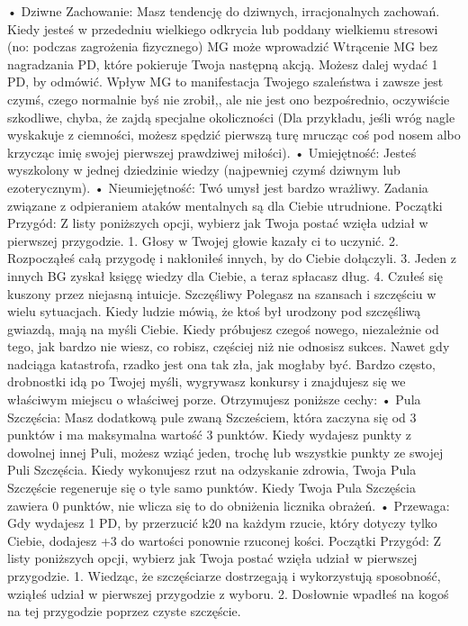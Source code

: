     • Dziwne Zachowanie: Masz tendencję do dziwnych, irracjonalnych zachowań. Kiedy jesteś w przededniu wielkiego odkrycia lub poddany wielkiemu stresowi (no: podczas zagrożenia fizycznego) MG może wprowadzić Wtrącenie MG bez nagradzania PD, które pokieruje Twoja następną akcją. Możesz dalej wydać 1 PD, by odmówić. Wpływ MG to manifestacja Twojego szaleństwa i zawsze jest czymś, czego normalnie byś nie zrobił,, ale nie jest ono bezpośrednio, oczywiście szkodliwe, chyba, że zajdą specjalne okoliczności (Dla przykładu, jeśli wróg nagle wyskakuje z ciemności, możesz spędzić pierwszą turę mrucząc coś pod nosem albo krzycząc imię swojej pierwszej prawdziwej miłości). 
    • Umiejętność: Jesteś wyszkolony w jednej dziedzinie wiedzy (najpewniej czymś dziwnym lub ezoterycznym).
    • Nieumiejętność: Twó umysł jest bardzo wrażliwy. Zadania związane z odpieraniem ataków mentalnych są dla Ciebie utrudnione.
Początki Przygód: Z listy poniższych opcji, wybierz jak Twoja postać wzięła udział w pierwszej przygodzie.
1. Głosy w Twojej głowie kazały ci to uczynić.
2. Rozpocząłeś całą przygodę i nakłoniłeś innych, by do Ciebie dołączyli.
3. Jeden z innych BG zyskał księgę wiedzy dla Ciebie, a teraz spłacasz dług.
4. Czułeś się kuszony przez niejasną intuicje.
Szczęśliwy
Polegasz na szansach i szczęściu w wielu sytuacjach. Kiedy ludzie mówią, że ktoś był urodzony pod szczęśliwą gwiazdą, mają na myśli Ciebie. Kiedy próbujesz czegoś nowego, niezależnie od tego, jak bardzo nie wiesz, co robisz, częściej niż nie odnosisz sukces. Nawet gdy nadciąga katastrofa, rzadko jest ona tak zła, jak mogłaby być. Bardzo często, drobnostki idą po Twojej myśli, wygrywasz konkursy i znajdujesz się we właściwym miejscu o właściwej porze.
Otrzymujesz poniższe cechy:
    • Pula Szczęścia: Masz dodatkową pule zwaną Szcześciem, która zaczyna się od 3 punktów i ma maksymalna wartość 3 punktów. Kiedy wydajesz punkty z dowolnej innej Puli, możesz wziąć jeden, trochę lub wszystkie punkty ze swojej Puli Szczęścia. Kiedy wykonujesz rzut na odzyskanie zdrowia, Twoja Pula Szczęście regeneruje się o tyle samo punktów. Kiedy Twoja Pula Szczęścia zawiera 0 punktów, nie wlicza się to do obniżenia licznika obrażeń. 
    • Przewaga: Gdy wydajesz 1 PD, by przerzucić k20 na każdym rzucie, który dotyczy tylko Ciebie, dodajesz +3 do wartości ponownie rzuconej kości. 
Początki Przygód: Z listy poniższych opcji, wybierz jak Twoja postać wzięła udział w pierwszej przygodzie.
1. Wiedząc, że szczęściarze dostrzegają i wykorzystują sposobność, wziąłeś udział w pierwszej przygodzie z wyboru. 
2. Dosłownie wpadłeś na kogoś na tej przygodzie poprzez czyste szczęście.
